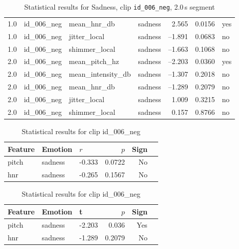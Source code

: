 \begin{table}[ht]
\begin{subtable}[t]{0.48\textwidth}
\begin{tabular}{l l l l r r l}
      1.0 & id\_006\_neg & mean\_hnr\_db       & sadness &  2.565 & 0.0156 & yes \\
      1.0 & id\_006\_neg & jitter\_local       & sadness & –1.891 & 0.0683 & no  \\
      1.0 & id\_006\_neg & shimmer\_local      & sadness & –1.663 & 0.1068 & no  \\
        2.0 & id\_006\_neg & mean\_pitch\_hz     & sadness & –2.203 & 0.0360 & yes \\
        2.0 & id\_006\_neg & mean\_intensity\_db & sadness & –1.307 & 0.2018 & no  \\
        2.0 & id\_006\_neg & mean\_hnr\_db       & sadness & –1.289 & 0.2079 & no  \\
        2.0 & id\_006\_neg & jitter\_local       & sadness &  1.009 & 0.3215 & no  \\
        2.0 & id\_006\_neg & shimmer\_local      & sadness &  0.157 & 0.8766 & no  \\
        \bottomrule
      \end{tabular}
    \end{subtable}
    \caption{Statistical results for Sadness, clip \texttt{id\_006\_neg}, 2.0\,s segment}
    \label{tab:clip006_neg_stats}
  \end{table}
  
  \begin{table}[H]
    \centering
    \begin{subtable}[t]{0.48\textwidth}
      \centering
      \caption{Clip id\_006\_neg – Pearson Correlation}
      \label{tab:clip006_neg_pearson}
      \begin{tabular}{lllrrl}
        \toprule
        Feature               & Emotion & $r$ & $p$ & Sign \\
        \midrule
        pitch       & sadness    &  -0.333 & 0.0722 & No  \\
        hnr    & sadness    & -0.265 & 0.1567 & No  \\
        \bottomrule
      \end{tabular}
    \end{subtable}
    \hfill
    \begin{subtable}[t]{0.48\textwidth}
      \centering
      \caption{Clip id\_006\_neg – t-test}
      \label{tab:clip006_neg_ttest}
      \begin{tabular}{lllrrl}
        \toprule
        Feature               & Emotion & t & $p$& Sign \\
        \midrule

        pitch       & sadness    &  -2.203 & 0.036 & Yes  \\
        hnr    & sadness    & -1.289 & 0.2079 & No  \\
        \bottomrule
      \end{tabular}
    \end{subtable}
    \caption{Statistical results for clip id\_006\_neg}
    \label{tab:clip006_neg_stats}
  \end{table}